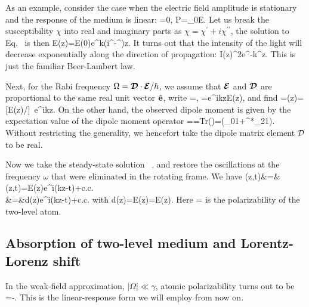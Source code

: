 As an example, consider the case when the electric field amplitude is stationary and the response of the medium is linear:
\bea
{}=0, \quad \mathcal P=\epsilon_0\chi\mathcal E.
\eea
Let us break the susceptibility $\chi$ into real and imaginary parts as $\chi=\chi^\prime+i\chi^{\prime\prime}$, the solution to Eq.~  is then
\bea
\mathcal E(z)=\mathcal E(0)e^{k(i\chi^\prime-\chi^{\prime\prime})z}.
\eea
It turns out that the intensity of the light will decrease exponentially along the direction of propagation:
\bea
I(z)\propto{}^2\propto e^{-k\chi^{\prime\prime}z}.
\eea
This is just the familiar Beer-Lambert law.

Next, for the Rabi frequency $\Omega=\bdip\cdot\cbE/\hbar$, we assume that $\cbE$ and $\bdip$ are proportional to the same real unit vector $\hat {\bf e}$, write
\bea
\bdip=\dip{}, \quad \cbE=e^{ikz}\mathcal E(z),
\eea
and find
\bea
\Omega=\Omega(z)=[\dip \mathcal E(z)/\hbar]\, e^{ikz}.
\eea
On the other hand, the observed dipole moment is given by the expectation value of the dipole moment operator
\bea
\bd=\langle\hat{\bd}\rangle={\rm Tr}\left(\hat{\bd}\rho\right)=(\dip\rho_{01}+\dip^*\rho_{21}).
\eea
Without restricting the generality, we hencefort take the dipole matrix element $\dip$ to be real.

Now we take the steady-state solution ~, and restore the oscillations at the frequency $\omega$ that were eliminated in the rotating frame. We have
\bea
\bd(z,t)&=&\langle\hat{\bd}\rangle(z,t)=\mathcal E(z)e^{i(kz-\omega t)}+{\rm c.c.}\nonumber\\
&=&d(z)e^{i(kz-\omega t)}+{\rm c.c.}
\eea
with
\bea
d(z)=\mathcal E(z)=\alpha\mathcal E(z).
\eea
Here 
\beq
\alpha=\label{ATOM_POLARIZABILITY}
\eeq
 is the polarizability of the two-level atom.

\subsection{Absorption of two-level medium and Lorentz-Lorenz shift}
In the weak-field approximation, $|\Omega|\ll\gamma$, atomic polarizability turns out to be
\bea
\alpha=-.
\label{POLARIZABILITY}
\eea
This is the linear-response form we will employ from now on.

